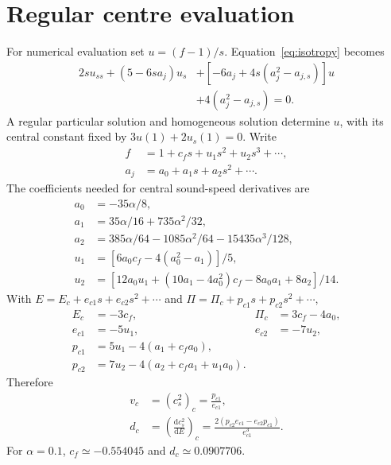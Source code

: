 \documentclass[aps,prd,reprint,a4paper,nofootinbib,floatfix]{revtex4-2}
\newcommand{\dd}{\mathrm d}
\begin{document}
\ifdefined\appendices\appendices\else\appendix\fi
\section{Regular centre evaluation}
\label{app:centre}
For numerical evaluation set $u=(f-1)/s$. Equation~\eqref{eq:isotropy} becomes
\begin{align}
 2s u_{ss}+(5-6sa_j)u_s
 &+[-6a_j+4s(a_j^2-a_{j,s})]u\nonumber\\
 &+4(a_j^2-a_{j,s})=0.
\end{align}
A regular particular solution and homogeneous solution determine $u$, with its central constant fixed by $3u(1)+2u_s(1)=0$. Write
\begin{align}
 f&=1+c_f s+u_1s^2+u_2s^3+\cdots,\nonumber\\
 a_j&=a_0+a_1s+a_2s^2+\cdots.
\end{align}
The coefficients needed for central sound-speed derivatives are
\begin{align}
 a_0&=-35\alpha/8,\nonumber\\
 a_1&=35\alpha/16+735\alpha^2/32,\nonumber\\
 a_2&=385\alpha/64-1085\alpha^2/64-15435\alpha^3/128,\\
 u_1&=[6a_0c_f-4(a_0^2-a_1)]/5,\nonumber\\
 u_2&=[12a_0u_1+(10a_1-4a_0^2)c_f-8a_0a_1+8a_2]/14.
\end{align}
With $E=E_c+e_{c1}s+e_{c2}s^2+\cdots$ and $\Pi=\Pi_c+p_{c1}s+p_{c2}s^2+\cdots$,
\begin{align}
 E_c&=-3c_f,&\Pi_c&=3c_f-4a_0,\nonumber\\
 e_{c1}&=-5u_1,&e_{c2}&=-7u_2,\nonumber\\
 p_{c1}&=5u_1-4(a_1+c_fa_0),\nonumber\\
 p_{c2}&=7u_2-4(a_2+c_fa_1+u_1a_0).
\end{align}
Therefore
\begin{align}
 v_c&=(c_s^2)_c=\frac{p_{c1}}{e_{c1}},\nonumber\\
 d_c&=\left(\frac{\dd c_s^2}{\dd E}\right)_c
     =\frac{2(p_{c2}e_{c1}-e_{c2}p_{c1})}{e_{c1}^3}.
\end{align}
For $\alpha=0.1$, $c_f\simeq-0.554045$ and $d_c\simeq0.0907706$.
\end{document}
